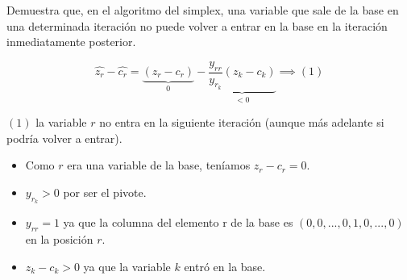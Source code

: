 \begin{problem}[8]
Demuestra que, en el algoritmo del simplex, una variable que sale de la base en una determinada
iteración no puede volver a entrar en la base en la iteración inmediatamente posterior.
\solution

\[\hat{z_r} - \hat{c_r} = \underbrace{(z_r - c_r)}_{0} - \underbrace{\frac{y_{rr}}{y_{r_k}} (z_k - c_k)}_{<0}\implies (1)\]

$(1)$  la variable $r$ no entra en la siguiente iteración (aunque más adelante si podría volver a entrar).

\begin{itemize}
\item Como $r$ era una variable de la base, teníamos $z_r - c_r = 0$.
\item $y_{r_k} > 0$ por ser el pivote.
\item $y_{rr} = 1$ ya que la columna del elemento r de la base es $(0,0,...,0,1,0,...,0)$ en la posición $r$.
\item $z_k - c_k > 0$ ya que la variable $k$ entró en la base.
\end{itemize}

\end{problem}

